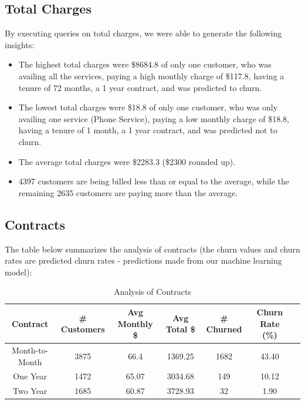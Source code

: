 \documentclass{article}
\theoremstyle{mytheoremstyle}
\theoremstyle{mytheoremstyle}
\theoremstyle{myproblemstyle}
\begin{document}
\subsection{Total Charges}
By executing queries on total charges, we were able to generate the following insights:
\begin{itemize}
    \item The highest total charges were \$8684.8 of only one customer, who was availing all the services, paying a high monthly charge of \$117.8, having a tenure of 72 months, a 1 year contract, and was predicted to churn.
    \item The lowest total charges were \$18.8 of only one customer, who was only availing one service (Phone Service), paying a low monthly charge of \$18.8, having a tenure of 1 month, a 1 year contract, and was predicted not to churn.
    \item The average total charges were \$2283.3 (\$2300 rounded up).
    \item 4397 customers are being billed less than or equal to the average, while the remaining 2635 customers are paying more than the average.
\end{itemize}

\subsection{Contracts}
The table below summarizes the analysis of contracts (the churn values and churn rates are predicted churn rates - predictions made from our machine learning model):

\begin{table}[H]
    \centering
    \begin{tabular}{|c|c|c|c|c|c|c|}
        \hline
        \textbf{Contract} & \textbf{\# Customers} & \textbf{Avg Monthly \$} & \textbf{Avg Total \$} & \textbf{\# Churned} & \textbf{Churn Rate (\%)} \\
        \hline
        Month-to-Month & 3875 & 66.4 & 1369.25 & 1682 & 43.40 \\
        One Year & 1472 & 65.07 & 3034.68 & 149 & 10.12 \\
        Two Year & 1685 & 60.87 & 3728.93 & 32 & 1.90 \\
        \hline
    \end{tabular}
    \caption{Analysis of Contracts}
\end{table}
\end{document}
